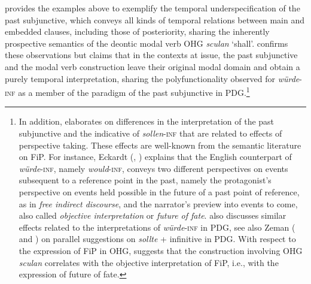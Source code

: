 \documentclass[output=paper,colorlinks,citecolor=brown]{langscibook}
\begin{document}
\citet{Petrova2008} provides the examples above to exemplify the temporal underspecification of the past subjunctive, which conveys all kinds of temporal relations between main and embedded clauses, including those of posteriority, sharing the inherently prospective semantics of the deontic modal verb OHG \textit{sculan} ‘shall’. \citet{Schönherr2011} confirms these observations but claims that in the contexts at issue, the past subjunctive and the modal verb construction leave their original modal domain and obtain a purely temporal interpretation, sharing the polyfunctionality observed for \textit{würde}-\textsc{inf} as a member of the paradigm of the past subjunctive in PDG.\footnote{In addition, \citet{Schönherr2011} elaborates on differences in the interpretation of the past subjunctive and the indicative of \textit{sollen}-\textsc{inf} that are related to effects of perspective taking. These effects are well-known from the semantic literature on FiP. For instance, Eckardt (\citeyear{Eckardt2015}, \citeyear{Eckardt2017}) explains that the English counterpart of \textit{würde}-\textsc{inf}, namely \textit{would}-\textsc{inf}, conveys two different perspectives on events subsequent to a reference point in the past, namely the protagonist’s perspective on events held possible in the future of a past point of reference, as in \textit{free indirect discourse}, and the narrator’s preview into events to come, also called \textit{objective interpretation} or \textit{future of fate}. \citet[145–152]{Thieroff1992} also discusses similar effects related to the interpretations of \textit{würde}-\textsc{inf} in PDG, see also Zeman (\citeyear{Zeman2018} and \citeyear{Zeman2020}) on parallel suggestions on \textit{sollte} + infinitive in PDG. With respect to the expression of FiP in OHG, \citet{Schönherr2011} suggests that the construction involving OHG \textit{sculan} correlates with the objective interpretation of FiP, i.e., with the expression of future of fate.}

\largerpage[1]
\end{document}
